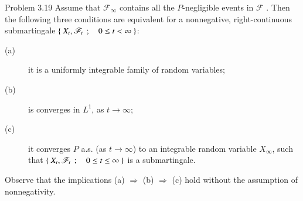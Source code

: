 	\begin{itembox}[l]{Problem 3.19}
		Assume that $\mathscr{F}_\infty$ contains all the $P$-negligible events in $\mathscr{F}$ \footnotemark.
		Then the following three conditions are equivalent for a nonnegative, right-continuous 
		submartingale $\left\{\ X_t,\mathscr{F}_t\ \, ; \quad 0 \leq t < \infty\ \right\}$:
		\begin{description}
			\item[(a)] it is a uniformly integrable family of random variables;
			\item[(b)] is converges in $L^1$, as $t \to \infty$;
			\item[(c)] it converges $P$ a.s. (as $t \to \infty$) to an integrable random variable $X_\infty$,
			such that $\left\{\ X_t,\mathscr{F}_t\ \, ; \quad 0 \leq t \leq \infty\ \right\}$ is a submartingale.
		\end{description}
		Observe that the implications (a) $\Rightarrow$ (b) $\Rightarrow$ (c) hold without the assumption of nonnegativity. 
	\end{itembox}
